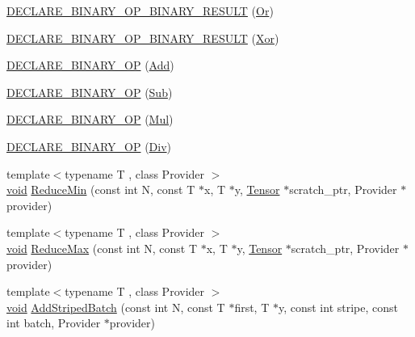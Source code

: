 \begin{DoxyCompactItemize}
\item 
\mbox{\hyperlink{namespaceonnxruntime_1_1math_a169fb05b904dbb586b2751500ea884d8}{D\+E\+C\+L\+A\+R\+E\+\_\+\+B\+I\+N\+A\+R\+Y\+\_\+\+O\+P\+\_\+\+B\+I\+N\+A\+R\+Y\+\_\+\+R\+E\+S\+U\+LT}} (\mbox{\hyperlink{classonnxruntime_1_1Or}{Or}})
\item 
\mbox{\hyperlink{namespaceonnxruntime_1_1math_a46225e4a60d2d2f6d6c5589a73b2d576}{D\+E\+C\+L\+A\+R\+E\+\_\+\+B\+I\+N\+A\+R\+Y\+\_\+\+O\+P\+\_\+\+B\+I\+N\+A\+R\+Y\+\_\+\+R\+E\+S\+U\+LT}} (\mbox{\hyperlink{classonnxruntime_1_1Xor}{Xor}})
\item 
\mbox{\hyperlink{namespaceonnxruntime_1_1math_a9a38b5a6659a7f243892c548a29cc51f}{D\+E\+C\+L\+A\+R\+E\+\_\+\+B\+I\+N\+A\+R\+Y\+\_\+\+OP}} (\mbox{\hyperlink{classonnxruntime_1_1Add}{Add}})
\item 
\mbox{\hyperlink{namespaceonnxruntime_1_1math_a9447729986833e9f070f2b05fee2015d}{D\+E\+C\+L\+A\+R\+E\+\_\+\+B\+I\+N\+A\+R\+Y\+\_\+\+OP}} (\mbox{\hyperlink{classonnxruntime_1_1Sub}{Sub}})
\item 
\mbox{\hyperlink{namespaceonnxruntime_1_1math_aa3be8e2ae09cf2e5e16afe9c76746173}{D\+E\+C\+L\+A\+R\+E\+\_\+\+B\+I\+N\+A\+R\+Y\+\_\+\+OP}} (\mbox{\hyperlink{classonnxruntime_1_1Mul}{Mul}})
\item 
\mbox{\hyperlink{namespaceonnxruntime_1_1math_a38a8f85de1d3fedced4675046a6c9464}{D\+E\+C\+L\+A\+R\+E\+\_\+\+B\+I\+N\+A\+R\+Y\+\_\+\+OP}} (\mbox{\hyperlink{classonnxruntime_1_1Div}{Div}})
\item 
{\footnotesize template$<$typename T , class Provider $>$ }\\\mbox{\hyperlink{mlasi_8h_a88f941d423cb2a819b70a1358982b1a6}{void}} \mbox{\hyperlink{namespaceonnxruntime_1_1math_a2bcac2ff93c3f1cf0997f26c72e6c055}{Reduce\+Min}} (const int N, const T $\ast$x, T $\ast$y, \mbox{\hyperlink{classonnxruntime_1_1Tensor}{Tensor}} $\ast$scratch\+\_\+ptr, Provider $\ast$provider)
\item 
{\footnotesize template$<$typename T , class Provider $>$ }\\\mbox{\hyperlink{mlasi_8h_a88f941d423cb2a819b70a1358982b1a6}{void}} \mbox{\hyperlink{namespaceonnxruntime_1_1math_afd4d86c778cf69822751d1de899b0ac1}{Reduce\+Max}} (const int N, const T $\ast$x, T $\ast$y, \mbox{\hyperlink{classonnxruntime_1_1Tensor}{Tensor}} $\ast$scratch\+\_\+ptr, Provider $\ast$provider)
\item 
{\footnotesize template$<$typename T , class Provider $>$ }\\\mbox{\hyperlink{mlasi_8h_a88f941d423cb2a819b70a1358982b1a6}{void}} \mbox{\hyperlink{namespaceonnxruntime_1_1math_a204b2ced988c7d73477b57d38688a53d}{Add\+Striped\+Batch}} (const int N, const T $\ast$first, T $\ast$y, const int stripe, const int batch, Provider $\ast$provider)

\end{DoxyCompactItemize}
